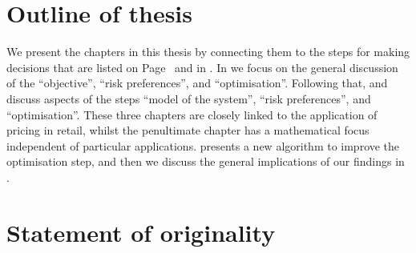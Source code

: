 \documentclass[main.tex]{subfiles}
\begin{document}
\section{Outline of thesis}
We present the chapters in this thesis by connecting them to the
steps for making decisions that are listed
on Page~\pageref{enum:making_decisions} and in .
In  we focus on the general discussion of the
``objective'', ``risk preferences'', and ``optimisation''.
Following that,  and
 discuss  aspects of the steps ``model of the system'', ``risk
preferences'', and ``optimisation''.
These three chapters are closely linked to the application of pricing
in retail, whilst the penultimate chapter has a mathematical focus
independent of particular applications.
 presents a new
algorithm to improve the optimisation step, and then we discuss
the general implications of our findings in .

\section{Statement of originality}


\biblio{} %
\end{document}
